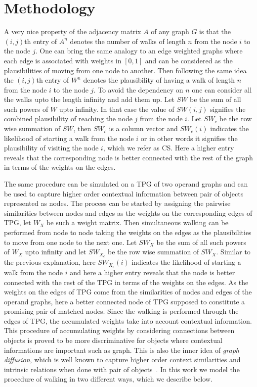 \section{Methodology}
\label{sec:pg:method}
A very nice property of the adjacency matrix $A$ of any graph $G$ is that the $(i,j)$th entry of $A^n$ denotes the number of walks of length $n$ from the node $i$ to the node $j$. One can bring the same analogy to an edge weighted graphs where each edge is associated with weights in $[0,1]$ and can be considered as the plausibilities of moving from one node to another. Then following the same idea the $(i,j)$th entry of $W^n$ denotes the plausibility of having a walk of length $n$ from the node $i$ to the node $j$. To avoid the dependency on $n$ one can consider all the walks upto the length infinity and add them up. Let $SW$ be the sum of all such powers of $W$ upto infinity. In that case the value of $SW(i,j)$ signifies the combined plausibility of reaching the node $j$ from the node $i$. Let $SW_c$ be the row wise summation of $SW$, then $SW_c$ is a column vector and $SW_c(i)$ indicates the likelihood of starting a walk from the node $i$ or in other words it signifies the plausibility of visiting the node $i$, which we refer as CS. Here a higher entry reveals that the corresponding node is better connected with the rest of the graph in terms of the weights on the edges.

The same procedure can be simulated on a TPG of two operand graphs and can be used to capture higher order contextual information between pair of objects represented as nodes. The process can be started by assigning the pairwise similarities between nodes and edges as the weights on the corresponding edges of TPG, let $W_X$ be such a weight matrix. Then simultaneous walking can be performed from node to node taking the weights on the edges as the plausibilities to move from one node to the next one. Let $SW_X$ be the sum of all such powers of $W_X$ upto infinity and let $SW_{X_c}$ be the row wise summation of $SW_X$. Similar to the previous explanation, here $SW_{X_c}(i)$ indicates the likelihood of starting a walk from the node $i$ and here a higher entry reveals that the node is better connected with the rest of the TPG in terms of the weights on the edges. As the weights on the edges of TPG come from the similarities of nodes and edges of the operand graphs, here a better connected node of TPG supposed to constitute a promising pair of matched nodes. Since the walking is performed through the edges of TPG, the accumulated weights take into account contextual information. This procedure of accumulating weights by considering connections between objects is proved to be more discriminative for objects where contextual informations are important such as graph. This is also the inner idea of \emph{graph diffusion}, which is well known to capture higher order context similarities and intrinsic relations when done with pair of objects~\cite{Szummer2002,Coifman2006,Yang2012}. In this work we model the procedure of walking in two different ways, which we describe below.

